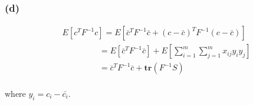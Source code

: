 \subsubsection*{(d)}
\begin{align*}
&E[c^TF^{-1}c] = E[\bar{c}^TF^{-1}\bar{c} + (c-\bar{c})^TF^{-1} (c-\bar{c})] \\
&\qquad \qquad \ \ =E[\bar{c}^TF^{-1}\bar{c}] + E[\sum_{i =1}^{m}\sum_{j =1}^{m}x_{ij}y_iy_j] \\
&\qquad \qquad \ \ =\bar{c}^TF^{-1}\bar{c} + \textbf{tr}(F^{-1}S)
\end{align*}
\paragraph{}
where $y_i = c_i -\bar{c_i}$.